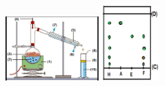 \documentclass[12pt]{article}
\begin{document}
\begin{figure}
	\vspace{-0.6cm}
	\begin{center}
    \includegraphics[width=0.32\textwidth]{./img/hydro.png}
	\includegraphics[width=0.2\textwidth]{./img/CCM.png}
\end{center}
\end{figure}
\end{document}

